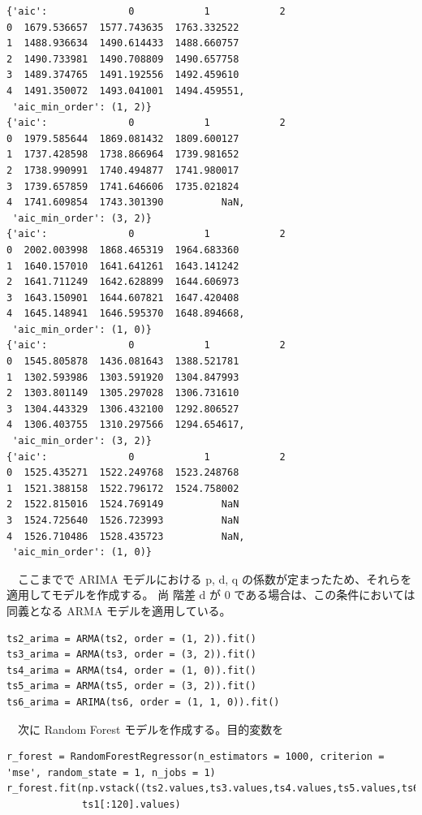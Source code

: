 \documentclass{scrartcl}
\begin{document}
\begin{verbatim}
{'aic':              0            1            2
0  1679.536657  1577.743635  1763.332522
1  1488.936634  1490.614433  1488.660757
2  1490.733981  1490.708809  1490.657758
3  1489.374765  1491.192556  1492.459610
4  1491.350072  1493.041001  1494.459551,
 'aic_min_order': (1, 2)}
{'aic':              0            1            2
0  1979.585644  1869.081432  1809.600127
1  1737.428598  1738.866964  1739.981652
2  1738.990991  1740.494877  1741.980017
3  1739.657859  1741.646606  1735.021824
4  1741.609854  1743.301390          NaN,
 'aic_min_order': (3, 2)}
{'aic':              0            1            2
0  2002.003998  1868.465319  1964.683360
1  1640.157010  1641.641261  1643.141242
2  1641.711249  1642.628899  1644.606973
3  1643.150901  1644.607821  1647.420408
4  1645.148941  1646.595370  1648.894668,
 'aic_min_order': (1, 0)}
{'aic':              0            1            2
0  1545.805878  1436.081643  1388.521781
1  1302.593986  1303.591920  1304.847993
2  1303.801149  1305.297028  1306.731610
3  1304.443329  1306.432100  1292.806527
4  1306.403755  1310.297566  1294.654617,
 'aic_min_order': (3, 2)}
{'aic':              0            1            2
0  1525.435271  1522.249768  1523.248768
1  1521.388158  1522.796172  1524.758002
2  1522.815016  1524.769149          NaN
3  1524.725640  1526.723993          NaN
4  1526.710486  1528.435723          NaN,
 'aic_min_order': (1, 0)}
\end{verbatim}

　ここまでで ARIMA モデルにおける p, d, q の係数が定まったため、それらを適用してモデルを作成する。 尚 階差 d が 0 である場合は、この条件においては同義となる ARMA モデルを適用している。\\
\begin{verbatim}
ts2_arima = ARMA(ts2, order = (1, 2)).fit()
ts3_arima = ARMA(ts3, order = (3, 2)).fit()
ts4_arima = ARMA(ts4, order = (1, 0)).fit()
ts5_arima = ARMA(ts5, order = (3, 2)).fit()
ts6_arima = ARIMA(ts6, order = (1, 1, 0)).fit()
\end{verbatim}

　次に Random Forest モデルを作成する。目的変数を\\
\begin{verbatim}
r_forest = RandomForestRegressor(n_estimators = 1000, criterion = 'mse', random_state = 1, n_jobs = 1)
r_forest.fit(np.vstack((ts2.values,ts3.values,ts4.values,ts5.values,ts6.values)).T,
             ts1[:120].values)
\end{verbatim}
\end{document}
